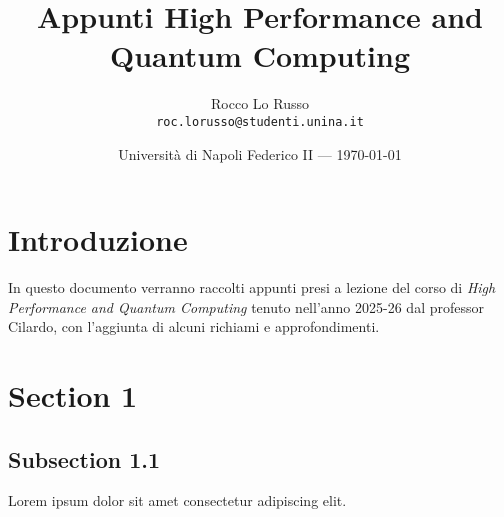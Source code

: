 \documentclass{article}
\title{Appunti High Performance and Quantum Computing}
\author{Rocco Lo Russo \\ \texttt{roc.lorusso@studenti.unina.it}}
\date{Università di Napoli Federico II --- \today}
\begin{document}
\maketitle

\section*{Introduzione}
In questo documento verranno raccolti appunti presi a lezione del corso di \textit{High Performance and Quantum Computing} tenuto nell'anno 2025-26 dal professor Cilardo, con l'aggiunta di alcuni richiami e approfondimenti. 

\tableofcontents
\newpage


\section{Section 1}
\subsection{Subsection 1.1}
Lorem ipsum dolor sit amet consectetur adipiscing elit.
\end{document}
